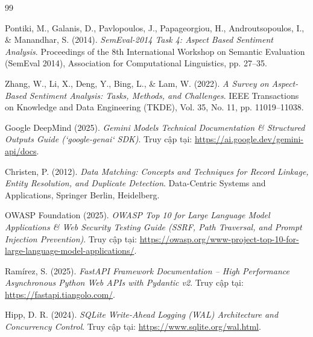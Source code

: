 \documentclass[12pt, a4paper]{article}
\begin{document}
\newpage
\begin{thebibliography}{99}

Pontiki, M., Galanis, D., Pavlopoulos, J., Papageorgiou, H., Androutsopoulos, I., \& Manandhar, S. (2014). \textit{SemEval-2014 Task 4: Aspect Based Sentiment Analysis}. Proceedings of the 8th International Workshop on Semantic Evaluation (SemEval 2014), Association for Computational Linguistics, pp. 27--35.

Zhang, W., Li, X., Deng, Y., Bing, L., \& Lam, W. (2022). \textit{A Survey on Aspect-Based Sentiment Analysis: Tasks, Methods, and Challenges}. IEEE Transactions on Knowledge and Data Engineering (TKDE), Vol. 35, No. 11, pp. 11019--11038.

Google DeepMind (2025). \textit{Gemini Models Technical Documentation \& Structured Outputs Guide (`google-genai` SDK)}. Truy cập tại: \url{https://ai.google.dev/gemini-api/docs}.

Christen, P. (2012). \textit{Data Matching: Concepts and Techniques for Record Linkage, Entity Resolution, and Duplicate Detection}. Data-Centric Systems and Applications, Springer Berlin, Heidelberg.

OWASP Foundation (2025). \textit{OWASP Top 10 for Large Language Model Applications \& Web Security Testing Guide (SSRF, Path Traversal, and Prompt Injection Prevention)}. Truy cập tại: \url{https://owasp.org/www-project-top-10-for-large-}\allowbreak\url{language-model-applications/}.

Ramírez, S. (2025). \textit{FastAPI Framework Documentation -- High Performance Asynchronous Python Web APIs with Pydantic v2}. Truy cập tại: \url{https://fastapi.tiangolo.com/}.

Hipp, D. R. (2024). \textit{SQLite Write-Ahead Logging (WAL) Architecture and Concurrency Control}. Truy cập tại: \url{https://www.sqlite.org/wal.html}.

\end{thebibliography}
\clearpage
\end{document}
